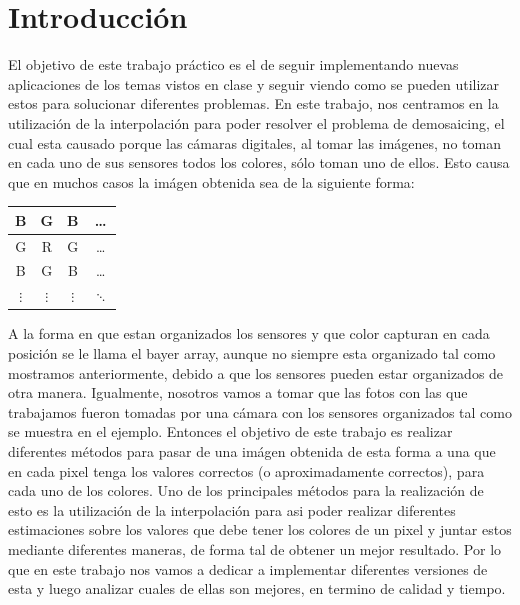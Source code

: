 \documentclass[10pt, a4paper]{article}
\begin{document}




\maketitle

\section{Introducci\'on}

El objetivo de este trabajo pr\'actico es el de seguir implementando nuevas aplicaciones de los temas vistos en clase y seguir viendo como se pueden utilizar estos para solucionar diferentes problemas. En este trabajo, nos centramos en la utilizaci\'on de la interpolaci\'on para poder resolver el problema de demosaicing, el cual esta causado porque las c\'amaras digitales, al tomar las im\'agenes, no toman en cada uno de sus sensores todos los colores, s\'olo toman uno de ellos. Esto causa que en muchos casos la im\'agen obtenida sea de la siguiente forma:

\begin{table}[h]
\centering
\begin{tabular}{|c | c | c | c |
}
\hline
B & G & B & \ldots \\
\hline
G & R & G & \ldots \\
\hline
B & G & B & \ldots \\
\hline
$\vdots$ & $\vdots$ & $\vdots$ & $\ddots$ \\
\hline
\end{tabular}
\end{table}

A la forma en que estan organizados los sensores y que color capturan en cada posici\'on se le llama el bayer array, aunque no siempre esta organizado tal como mostramos anteriormente, debido a que los sensores pueden estar organizados de otra manera. 
Igualmente, nosotros vamos a tomar que las fotos con las que trabajamos fueron tomadas por una c\'amara con los sensores organizados tal como se muestra en el ejemplo. Entonces el objetivo de este trabajo es realizar diferentes m\'etodos para pasar de una im\'agen obtenida de esta forma a una que en cada pixel tenga los valores correctos (o aproximadamente correctos), para cada uno de los colores. Uno de los principales m\'etodos para la realizaci\'on de esto es la utilizaci\'on de la interpolaci\'on para asi poder realizar diferentes estimaciones sobre los valores que debe tener los colores de un pixel y juntar estos mediante diferentes maneras, de forma tal de obtener un mejor resultado. Por lo que en este trabajo nos vamos a dedicar a implementar diferentes versiones de esta y luego analizar cuales de ellas son mejores, en termino de calidad y tiempo.
\end{document}
